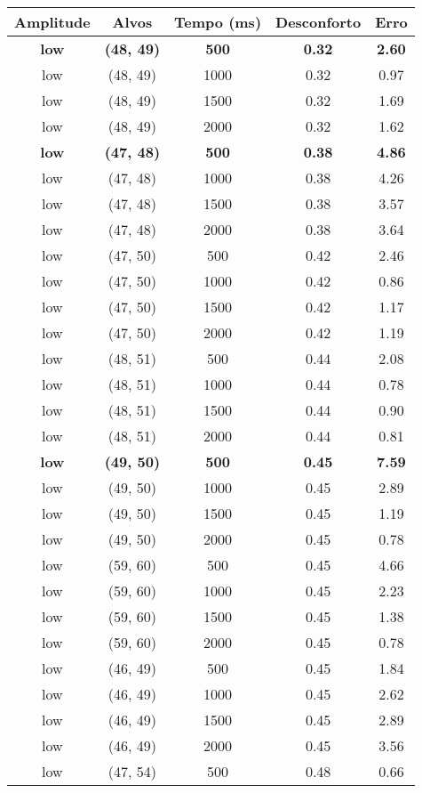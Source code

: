 \begin{tabular}{c c c c c}
\hline
Amplitude & Alvos & Tempo (ms) & Desconforto & Erro \\
\hline
\textbf{low} & \textbf{(48, 49)} & \textbf{ 500} & \textbf{0.32} & \textbf{2.60} \\
low & (48, 49) &  1000 & 0.32 & 0.97 \\
low & (48, 49) &  1500 & 0.32 & 1.69 \\
low & (48, 49) &  2000 & 0.32 & 1.62 \\
\textbf{low} & \textbf{(47, 48)} & \textbf{ 500} & \textbf{0.38} & \textbf{4.86} \\
low & (47, 48) &  1000 & 0.38 & 4.26 \\
low & (47, 48) &  1500 & 0.38 & 3.57 \\
low & (47, 48) &  2000 & 0.38 & 3.64 \\
low & (47, 50) &  500 & 0.42 & 2.46 \\
low & (47, 50) &  1000 & 0.42 & 0.86 \\
low & (47, 50) &  1500 & 0.42 & 1.17 \\
low & (47, 50) &  2000 & 0.42 & 1.19 \\
low & (48, 51) &  500 & 0.44 & 2.08 \\
low & (48, 51) &  1000 & 0.44 & 0.78 \\
low & (48, 51) &  1500 & 0.44 & 0.90 \\
low & (48, 51) &  2000 & 0.44 & 0.81 \\
\textbf{low} & \textbf{(49, 50)} & \textbf{ 500} & \textbf{0.45} & \textbf{7.59} \\
low & (49, 50) &  1000 & 0.45 & 2.89 \\
low & (49, 50) &  1500 & 0.45 & 1.19 \\
low & (49, 50) &  2000 & 0.45 & 0.78 \\
low & (59, 60) &  500 & 0.45 & 4.66 \\
low & (59, 60) &  1000 & 0.45 & 2.23 \\
low & (59, 60) &  1500 & 0.45 & 1.38 \\
low & (59, 60) &  2000 & 0.45 & 0.78 \\
low & (46, 49) &  500 & 0.45 & 1.84 \\
low & (46, 49) &  1000 & 0.45 & 2.62 \\
low & (46, 49) &  1500 & 0.45 & 2.89 \\
low & (46, 49) &  2000 & 0.45 & 3.56 \\
low & (47, 54) &  500 & 0.48 & 0.66 \\

\end{tabular}
